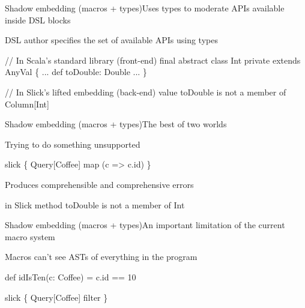\documentclass[compress,xcolor={usenames,dvipsnames,table}]{beamer}
\begin{document}
\begin{frame}[fragile]{Shadow embedding (macros + types)}{Uses types to moderate APIs available inside DSL blocks}
  \vspace{1em}
  \begin{exampleblock}{DSL author specifies the set of available APIs using types}
    \begin{semiverbatim}
// In Scala's standard library (front-end)
final abstract class Int private extends AnyVal \{
  ...
  def toDouble: Double
  ...
\}

// In Slick's lifted embedding (back-end)
value toDouble is not a member of Column[Int]
    \end{semiverbatim}
  \end{exampleblock}
\end{frame}

\begin{frame}[fragile]{Shadow embedding (macros + types)}{The best of two worlds}
  \vspace{1em}
  \begin{exampleblock}{Trying to do something unsupported}
    \begin{semiverbatim}
slick \{
  Query[Coffee] map
    (c => c.id\text{\color{blue}{.toDouble}})
\}
    \end{semiverbatim}
  \end{exampleblock}

  \vspace{1em}
  \begin{exampleblock}{Produces comprehensible and comprehensive errors}
    \begin{semiverbatim}
in Slick method toDouble is not a member of Int
    \end{semiverbatim}
  \end{exampleblock}
\end{frame}

\begin{frame}[fragile]{Shadow embedding (macros + types)}{An important limitation of the current macro system}
  \vspace{1em}
  \begin{alertblock}{Macros can't see ASTs of everything in the program}
    \begin{semiverbatim}
def idIsTen(c: Coffee) = c.id == 10

slick \{
  Query[Coffee] filter \text{\color{blue}{idIsTen}}
\}
    \end{semiverbatim}
  \end{alertblock}
\end{frame}
\end{document}
